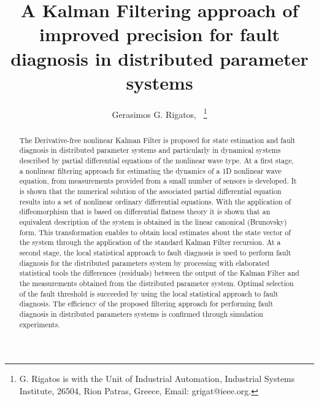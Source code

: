 \documentclass[journal]{IEEEtran}
\begin{document}
\title{A Kalman Filtering approach of improved precision
for fault diagnosis in distributed parameter systems}

\author{Gerasimos G. Rigatos,~
        \thanks{G. Rigatos is with the Unit of Industrial Automation, Industrial Systems Institute, 26504, Rion Patras, Greece, Email: grigat@ieee.org.}}














\maketitle


\begin{abstract}
The Derivative-free nonlinear Kalman Filter is proposed for state estimation and fault diagnosis in distributed parameter systems and particularly in dynamical systems described by partial differential equations of the nonlinear wave type. At a first stage, a nonlinear filtering approach for estimating the dynamics of a 1D nonlinear wave equation, from measurements provided from a small number of sensors is developed. It is shown that the numerical solution of the associated partial differential equation results into a set of nonlinear ordinary differential equations. With the application of diffeomorphism that is based on differential flatness theory it is shown that an equivalent description of the system is obtained in the linear canonical (Brunovsky) form. This transformation enables to obtain local estimates about the state vector of the system through the application of the standard Kalman Filter recursion. At a second stage, the local statistical approach to fault diagnosis is used to perform fault diagnosis for the distributed parameters system by processing with elaborated statistical tools the differences (residuals) between the output of the Kalman Filter and  the measurements obtained from the distributed parameter system. Optimal selection of the fault threshold is succeeded by using the local statistical approach to fault diagnosis. The efficiency of the proposed filtering approach for performing fault diagnosis in distributed parameters systems is confirmed through simulation experiments.
\end{abstract}
\end{document}
